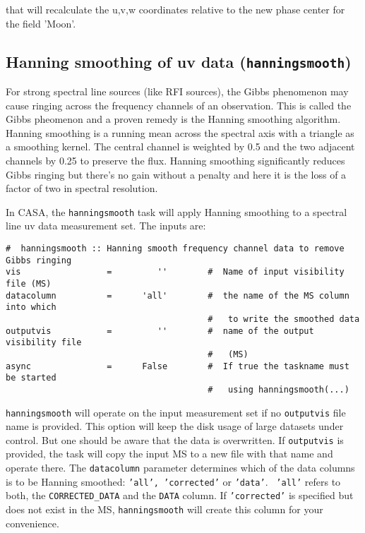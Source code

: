 that will recalculate the u,v,w coordinates relative to the new phase
center for the field 'Moon'.


\subsection{Hanning smoothing of uv data ({\tt hanningsmooth})}
\label{section:cal.other.hanningsmooth}

For strong spectral line sources (like RFI sources), the Gibbs
phenomenon may cause ringing across the frequency channels of an
observation. This is called the Gibbs pheomenon and a proven remedy is
the Hanning smoothing algorithm. Hanning smoothing is a running mean
across the spectral axis with a triangle as a smoothing kernel. The
central channel is weighted by 0.5 and the two adjacent channels by
0.25 to preserve the flux. Hanning smoothing significantly reduces
Gibbs ringing but there's no gain without a penalty and here it is the
loss of a factor of two in spectral resolution.

In CASA, the {\tt hanningsmooth} task will apply Hanning smoothing to a
spectral line uv data measurement set.  The inputs are:

\small
\begin{verbatim}
#  hanningsmooth :: Hanning smooth frequency channel data to remove Gibbs ringing
vis                 =         ''        #  Name of input visibility file (MS)
datacolumn          =      'all'        #  the name of the MS column into which
                                        #   to write the smoothed data
outputvis           =         ''        #  name of the output visibility file
                                        #   (MS)
async               =      False        #  If true the taskname must be started
                                        #   using hanningsmooth(...)
\end{verbatim}
\normalsize

{\tt hanningsmooth} will operate on the input measurement set if no
{\tt outputvis} file name is provided. This option will keep the disk
usage of large datasets under control. But one should be aware that
the data is overwritten. If {\tt outputvis} is provided, the task will
copy the input MS to a new file with that name and operate there. The
{\tt datacolumn} parameter determines which of the data columns is to
be Hanning smoothed: {\tt 'all', 'corrected'} or {\tt 'data'}. {\tt
  'all'} refers to both, the {\tt CORRECTED\_DATA} and the {\tt DATA}
column. If {\tt 'corrected'} is specified but does not exist in the
MS, {\tt hanningsmooth} will create this column for your convenience.

